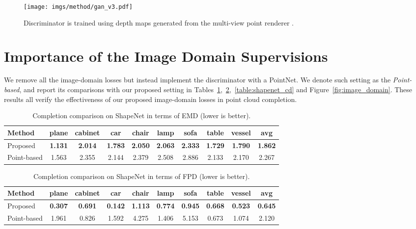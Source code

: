 \documentclass[final]{cvpr}
\begin{document}
\begin{figure}[h]
\centering
 \texttt{[image: imgs/method/gan\_v3.pdf]}
 \footnotesize
    \caption{Discriminator  is trained using depth maps generated from the multi-view point renderer .}
\label{fig:gan}
\end{figure}


\section{Importance of the Image Domain Supervisions}
We remove all the image-domain losses but instead implement the discriminator with a PointNet. We denote such setting as the \emph{Point-based}, and report its comparisons with our proposed setting in Tables~\ref{table:shapenet_emd},~\ref{table:shapenet_fpd},~\ref{table:shapenet_cd} and Figure~\ref{fig:image_domain}. These results all verify the effectiveness of our proposed image-domain losses in point cloud completion.  

\begin{table}[h]
\begin{center}
\footnotesize
\setlength\tabcolsep{1.5pt}
\begin{tabular}{@{}l|cccccccc|c@{}}
\toprule
Method&plane&cabinet&car&chair&lamp&sofa&table&vessel&avg\\
\midrule
Proposed & \textbf{1.131} & \textbf{2.014} & \textbf{1.783} & \textbf{2.050} & \textbf{2.063} & \textbf{2.333} & \textbf{1.729} & \textbf{1.790} & \textbf{1.862} \\
Point-based & 1.563 & 2.355 & 2.144 & 2.379 & 2.508 & 2.886 & 2.133 & 2.170 & 2.267 \\

\bottomrule
\end{tabular}
\end{center}
\caption{Completion comparison on ShapeNet in terms of EMD  (lower is better).}
\label{table:shapenet_emd}
\end{table}

\begin{table}[h]
\begin{center}
\footnotesize
\setlength\tabcolsep{1.5pt}
\begin{tabular}{@{}l|cccccccc|c@{}}
\toprule
Method&plane&cabinet&car&chair&lamp&sofa&table&vessel&avg\\
\midrule
Proposed & \textbf{0.307} & \textbf{0.691} & \textbf{0.142} & \textbf{1.113} & \textbf{0.774} & \textbf{0.945} & \textbf{0.668} & \textbf{0.523} & \textbf{0.645} \\
Point-based & 1.961 & 0.826 & 1.592 & 4.275 & 1.406 & 5.153 & 0.673 & 1.074 & 2.120 \\
\bottomrule
\end{tabular}
\end{center}
\caption{
Completion comparison on ShapeNet in terms of FPD  (lower is better).}
\label{table:shapenet_fpd}
\end{table}
\end{document}
